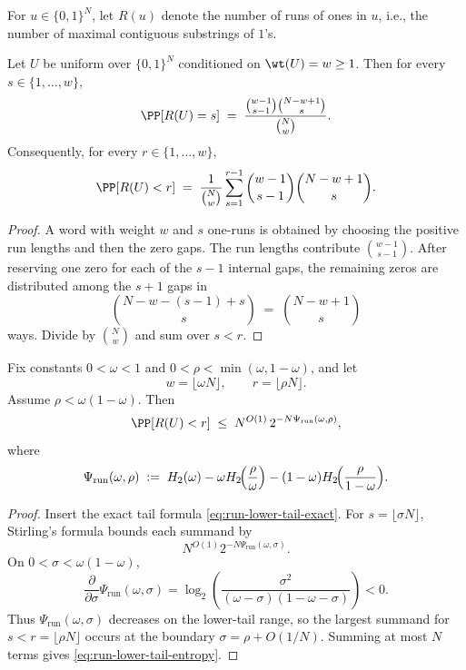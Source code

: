 \begin{definition}
\label{def:runs}
For $u\in\{0,1\}^N$, let $R(u)$ denote the number of runs of ones in $u$,
i.e., the number of maximal contiguous substrings of $1$'s.
\end{definition}

\begin{lemma}
\label{lem:run-count-distribution}
Let $U$ be uniform over $\{0,1\}^N$ conditioned on $\wt(U)=w\ge 1$.
Then for every $s\in\{1,\dots,w\}$,
\[
\PP[R(U)=s]
\;=\;
\frac{\binom{w-1}{s-1}\binom{N-w+1}{s}}{\binom{N}{w}}.
\]
Consequently, for every $r\in\{1,\dots,w\}$,
\begin{equation}
\label{eq:run-lower-tail-exact}
\PP[R(U)<r]
\;=\;
\frac{1}{\binom{N}{w}}
\sum_{s=1}^{r-1}
\binom{w-1}{s-1}\binom{N-w+1}{s}.
\end{equation}
\end{lemma}

\begin{proof}
A word with weight \(w\) and \(s\) one-runs is obtained by choosing the positive run lengths and then the zero gaps.
The run lengths contribute \(\binom{w-1}{s-1}\).  After reserving one zero for each of the \(s-1\) internal gaps, the
remaining zeros are distributed among the \(s+1\) gaps in
\[
\binom{N-w-(s-1)+s}{s}
\;=\;
\binom{N-w+1}{s}
\]
ways.  Divide by \(\binom{N}{w}\) and sum over \(s<r\).
\end{proof}

\begin{lemma}
\label{lem:run-lower-tail-entropy}
Fix constants \(0<\omega<1\) and \(0<\rho<\min(\omega,1-\omega)\), and let
\[
w=\lfloor \omega N\rfloor,
\qquad
r=\lfloor \rho N\rfloor.
\]
Assume \(\rho<\omega(1-\omega)\). Then
\begin{equation}
\label{eq:run-lower-tail-entropy}
\PP[R(U)<r]
\;\le\;
N^{O(1)}\,2^{-N\Psi_{\mathrm{run}}(\omega,\rho)},
\end{equation}
where
\begin{equation}
\label{eq:run-rate-function}
\Psi_{\mathrm{run}}(\omega,\rho)
\;:=\;
H_2(\omega)
- \omega H_2\!\Bigl(\frac{\rho}{\omega}\Bigr)
- (1-\omega)H_2\!\Bigl(\frac{\rho}{1-\omega}\Bigr).
\end{equation}
\end{lemma}

\begin{proof}
Insert the exact tail formula \eqref{eq:run-lower-tail-exact}.  For \(s=\lfloor\sigma N\rfloor\), Stirling's formula
bounds each summand by
\[
N^{O(1)}2^{-N\Psi_{\mathrm{run}}(\omega,\sigma)}.
\]
On \(0<\sigma<\omega(1-\omega)\),
\[
\frac{\partial}{\partial\sigma}\Psi_{\mathrm{run}}(\omega,\sigma)
=
\log_2\!\left(\frac{\sigma^2}{(\omega-\sigma)(1-\omega-\sigma)}\right)<0.
\]
Thus \(\Psi_{\mathrm{run}}(\omega,\sigma)\) decreases on the lower-tail range, so the largest summand for
\(s<r=\lfloor\rho N\rfloor\) occurs at the boundary \(\sigma=\rho+O(1/N)\).  Summing at most \(N\) terms gives
\eqref{eq:run-lower-tail-entropy}.
\end{proof}

